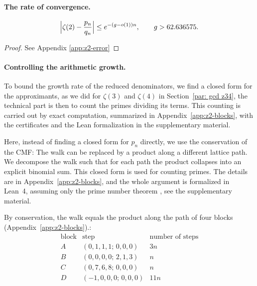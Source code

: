 \paragraph{The rate of convergence.}

\begin{lemma}\label{lem:z2-selected-error}
\[
  \Bigl|\zeta(2)-\frac{p_{n}}{q_n}\Bigr|
  \le e^{-(g-o(1))n},\qquad g>62.636575 .
\]
\end{lemma}

\begin{proof}
See Appendix \ref{app:z2-error}
\end{proof}




\paragraph{Controlling the arithmetic growth.}
\label{subsubsec:zeta2-blocks}
To bound the growth rate of the reduced denominators, we find a closed form for the approximants, as we did for $\zeta(3)$ and $\zeta(4)$ in Section~\ref{par: gcd z34}, the technical part is then to count the primes dividing its terms. 
This counting is carried out by exact computation, summarized in Appendix~\ref{app:z2-blocks}, with the certificates and the Lean formalization in the supplementary material.

Here, instead of finding a closed form for $p_n$ directly, we use the conservation of the CMF: The walk can be replaced by a product along a different lattice path. We decompose the walk such that for each path the product collapses into an explicit binomial sum. This closed form is used for counting primes. The details are in Appendix~\ref{app:z2-blocks}, and the whole argument is formalized in Lean~4, assuming only the prime number theorem \cite{demoura2021lean4}, see the supplementary material.

By conservation, the walk equals the product along the path of four blocks (Appendix~\ref{app:z2-blocks}).:
\[
\begin{array}{c|c|c}
\text{block}&\text{step}&\text{number of steps}\\\hline
A&(0,1,1,1;\,0,0,0)&3n\\
B&(0,0,0,0;\,2,1,3)&n\\
C&(0,7,6,8;\,0,0,0)&n\\
D&(-1,0,0,0;\,0,0,0)&11n
\end{array}
\]

